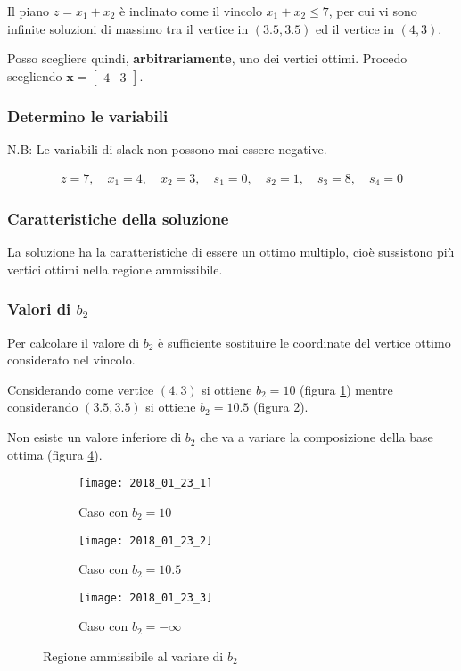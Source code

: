 \documentclass[\main/main.tex]{subfiles}
\begin{document}
Il piano $z = x_1 + x_2$ è inclinato come il vincolo $x_1 + x_2 \leq 7$, per cui vi sono infinite soluzioni di massimo tra il vertice in $(3.5, 3.5)$ ed il vertice in $(4,3)$.

Posso scegliere quindi, \textbf{arbitrariamente}, uno dei vertici ottimi. Procedo scegliendo $\bm{x} = \begin{bmatrix}
		4 & 3
	\end{bmatrix}$.

\subsubsection*{Determino le variabili}
N.B: Le variabili di slack non possono mai essere negative.

\begin{align*}
	z   = 7,\quad
	x_1 = 4,\quad
	x_2 = 3,\quad
	s_1 = 0,\quad
	s_2 = 1,\quad
	s_3 = 8,\quad
	s_4 = 0
\end{align*}

\subsubsection*{Caratteristiche della soluzione}
La soluzione ha la caratteristiche di essere un ottimo multiplo, cioè sussistono più vertici ottimi nella regione ammissibile.

\subsubsection*{Valori di $b_2$}
Per calcolare il valore di $b_2$ è sufficiente sostituire le coordinate del vertice ottimo considerato nel vincolo.

Considerando come vertice $(4,3)$ si ottiene $b_2 = 10$ (figura \ref{2018_23_01}) mentre considerando $(3.5, 3.5)$ si ottiene $b_2 = 10.5$ (figura \ref{2018_23_02}).

Non esiste un valore inferiore di $b_2$ che va a variare la composizione della base ottima (figura \ref{2018_23_03}).

\begin{figure}
	\begin{subfigure}{0.32\textwidth}
		\texttt{[image: 2018\_01\_23\_1]}
		\caption{Caso con $b_2=10$}
		\label{2018_23_01}
	\end{subfigure}
	\begin{subfigure}{0.32\textwidth}
		\texttt{[image: 2018\_01\_23\_2]}
		\caption{Caso con $b_2=10.5$}
		\label{2018_23_02}
	\end{subfigure}
	\begin{subfigure}{0.32\textwidth}
		\texttt{[image: 2018\_01\_23\_3]}
		\caption{Caso con $b_2=-\infty$}
		\label{2018_23_03}
	\end{subfigure}
	\caption{Regione ammissibile al variare di $b_2$}
\end{figure}
\end{document}
